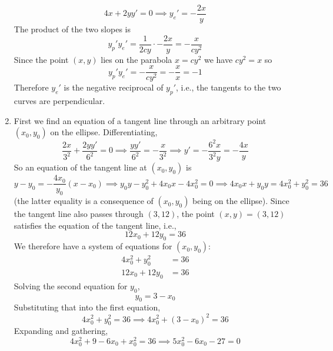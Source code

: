 \documentclass{article}
\begin{document}
\begin{enumerate}
\begin{equation*}
    4x + 2yy' = 0 \implies y_e' = -\frac{2x}{y}
  \end{equation*}
  The product of the two slopes is
  \begin{equation*}
    y_p' y_e' = \frac{1}{2cy} \cdot -\frac{2x}{y} = -\frac{x}{cy^2} 
  \end{equation*}
  Since the point $(x,y)$ lies on the parabola $x=cy^2$ we have
  $cy^2=x$ so
  \begin{equation*}
    y_p' y_e' = -\frac{x}{cy^2} = -\frac{x}{x} = -1
  \end{equation*}
  Therefore $y_e'$ is the negative reciprocal of $y_p'$, i.e., the
  tangents to the two curves are perpendicular.
\item %
  First we find an equation of a tangent line through an arbitrary
  point $(x_0,y_0)$ on the ellipse.  Differentiating,
  \begin{equation*}
    \frac{2x}{3^2} + \frac{2yy'}{6^2} = 0
    \implies 
    \frac{yy'}{6^2} = -\frac{x}{3^2}
    \implies 
    y' = -\frac{6^2x}{3^2y} = -\frac{4x}{y}
  \end{equation*}
  So an equation of the tangent line at $(x_0,y_0)$ is
  \begin{equation*}
    y-y_0 = -\frac{4x_0}{y_0} (x-x_0)
    \implies
    y_0y - y_0^2 + 4x_0 x - 4x_0^2 = 0
    \implies 4x_0x + y_0y = 4x_0^2 + y_0^2 = 36
  \end{equation*}
  (the latter equality is a consequence of $(x_0,y_0)$ being on the
  ellipse).  Since the tangent line also passes through $(3,12)$, the
  point $(x,y)=(3,12)$ satisfies the equation of the tangent line,
  i.e.,
  \begin{equation*}
    12x_0 + 12y_0 = 36
  \end{equation*}
  We therefore have a system of equations for $(x_0,y_0)$:
  \begin{align*}
    4x_0^2 + y_0^2 &= 36 \\
    12x_0 + 12y_0 &= 36
  \end{align*}
  Solving the second equation for $y_0$,
  \begin{equation*}
    y_0 = 3 - x_0
  \end{equation*}
  Substituting that into the first equation,
  \begin{equation*}
    4x_0^2 + y_0^2 = 36
    \implies 4x_0^2 + (3-x_0)^2 = 36
  \end{equation*}
  Expanding and gathering,
  \begin{equation*}
    4x_0^2 + 9 - 6x_0 + x_0^2 = 36
    \implies 5x_0^2 - 6x_0 - 27 = 0

\end{equation*}
\end{enumerate}
\end{document}
